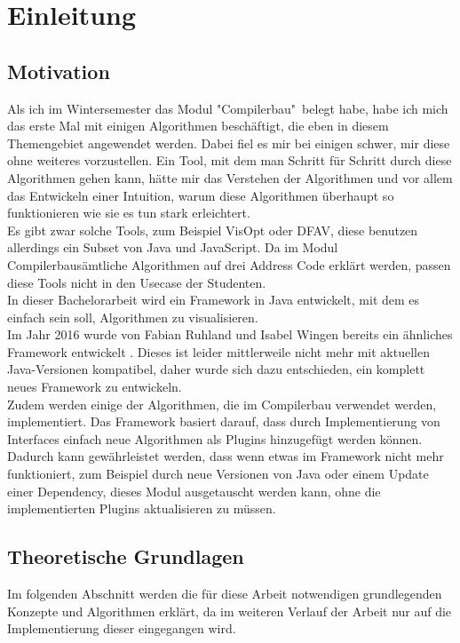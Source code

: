 \section{Einleitung}
\subsection{Motivation} \label{motiv}
Als ich im Wintersemester das Modul "Compilerbau"\ 
belegt habe, habe ich mich das erste Mal mit
einigen Algorithmen beschäftigt, die eben in diesem
Themengebiet angewendet werden. Dabei fiel es mir
bei einigen schwer, mir diese ohne weiteres
vorzustellen. Ein Tool, mit dem man Schritt für Schritt 
durch diese Algorithmen gehen kann, hätte mir das Verstehen der Algorithmen
und vor allem das Entwickeln einer Intuition, warum diese Algorithmen überhaupt
so funktionieren wie sie es tun stark erleichtert.\\

Es gibt zwar solche Tools, zum Beispiel VisOpt\cite{VisOpt} oder DFAV\cite{dfav},
diese benutzen allerdings ein Subset von Java und JavaScript.
Da im Modul \glqq Compilerbau\grqq sämtliche Algorithmen auf drei Address Code
erklärt werden, passen diese Tools nicht in den Usecase der Studenten.\\

In dieser Bachelorarbeit wird ein Framework in Java
entwickelt, mit dem es einfach sein soll,
Algorithmen zu visualisieren.\\

Im Jahr 2016 wurde von Fabian Ruhland und Isabel Wingen bereits ein ähnliches
Framework entwickelt \cite{toolbox}. Dieses ist leider mittlerweile nicht mehr
mit aktuellen Java-Versionen kompatibel, daher wurde sich dazu entschieden,
ein komplett neues Framework zu entwickeln.\\

Zudem werden einige der Algorithmen, die im Compilerbau verwendet werden,
implementiert. Das Framework basiert darauf, dass durch
Implementierung von Interfaces einfach neue Algorithmen 
als Plugins hinzugefügt werden können. Dadurch kann gewährleistet werden,
dass wenn etwas im Framework nicht mehr funktioniert, 
zum Beispiel durch neue Versionen von Java oder einem Update einer Dependency, 
dieses Modul ausgetauscht werden kann, ohne die implementierten Plugins 
aktualisieren zu müssen.


\newpage
\subsection{Theoretische Grundlagen}
Im folgenden Abschnitt werden die für diese Arbeit notwendigen 
grundlegenden Konzepte und Algorithmen erklärt, da im weiteren 
Verlauf der Arbeit nur auf die Implementierung dieser eingegangen wird.



